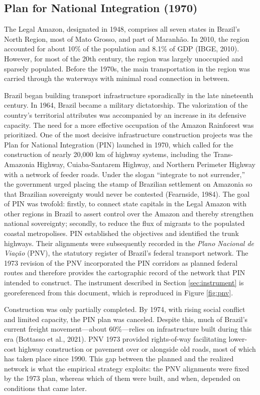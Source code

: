 \documentclass[11pt]{article}
\begin{document}
\subsection{Plan for National Integration (1970)}
The Legal Amazon, designated in 1948, comprises all seven states in Brazil’s North Region, most of Mato Grosso, and part of Maranhão. In 2010, the region accounted for about 10\% of the population and 8.1\% of GDP (IBGE, 2010). However, for most of the 20th century, the region was largely unoccupied and sparsely populated. Before the 1970s, the main transportation in the region was carried through the waterways with minimal road connection in between. 

Brazil began building transport infrastructure sporadically in the late nineteenth century. In 1964, Brazil became a military dictatorship. The valorization of the country's territorial attributes was accompanied by an increase in its defensive capacity. The need for a more effective occupation of the Amazon Rainforest was prioritized. One of the most decisive infrastructure construction projects was the Plan for National Integration (PIN) launched in 1970, which called for the construction of nearly 20,000 km of highway systems, including the Trans-Amazonia Highway, Cuiaba-Santarem Highway, and Northern Perimeter Highway with a network of feeder roads. Under the slogan “integrate to not surrender,” the government urged placing the stamp of Brazilian settlement on Amazonia so that Brazilian sovereignty would never be contested (Fearnside, 1984). The goal of PIN was twofold: firstly, to connect state capitals in the Legal Amazon with other regions in Brazil to assert control over the Amazon and thereby strengthen national sovereignty; secondly, to reduce the flux of migrants to the populated coastal metropolises. PIN established the objectives and identified the trunk highways. Their alignments were subsequently recorded in the \emph{Plano Nacional de Viação} (PNV), the statutory register of Brazil’s federal transport network. The 1973 revision of the PNV incorporated the PIN corridors as planned federal routes and therefore provides the cartographic record of the network that PIN intended to construct. The instrument described in Section \ref{sec:instrument} is georeferenced from this document, which is reproduced in Figure \ref{fig:pnv}.

Construction was only partially completed. By 1974, with rising social conflict and limited capacity, the PIN plan was canceled. Despite this, much of Brazil’s current freight movement—about 60\%—relies on infrastructure built during this era (Bottasso et al., 2021). PNV 1973 provided rights-of-way facilitating lower-cost highway construction or pavement over or alongside old roads, most of which has taken place since 1990. This gap between the planned and the realized network is what the empirical strategy exploits: the PNV alignments were fixed by the 1973 plan, whereas which of them were built, and when, depended on conditions that came later.
\end{document}
